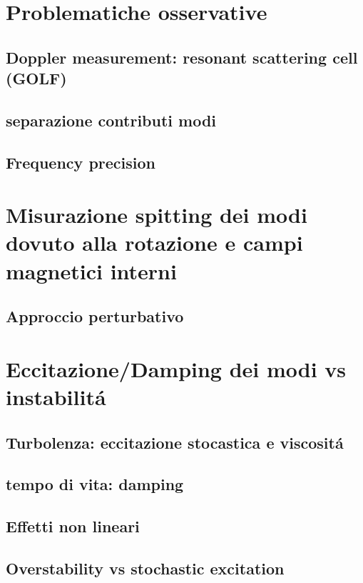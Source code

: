 \documentclass[../main.tex]{subfiles}
\begin{document}
\begin{refsection}

\nocite{*}

\section{Problematiche osservative}

\subsection{Doppler measurement: resonant scattering cell (GOLF)}



\begingroup
\let\clearpage\relax

\endgroup

\subsection{separazione contributi modi}

\subsection{Frequency precision}

\section{Misurazione spitting dei modi dovuto alla rotazione e campi magnetici interni}

\subsection{Approccio perturbativo}


\section{Eccitazione/Damping dei modi vs instabilit\'a}

\subsection{Turbolenza: eccitazione stocastica e viscosit\'a}

\subsection{tempo di vita: damping}

\subsection{Effetti non lineari}

\subsection{Overstability vs stochastic excitation}



\end{refsection}
\end{document}
